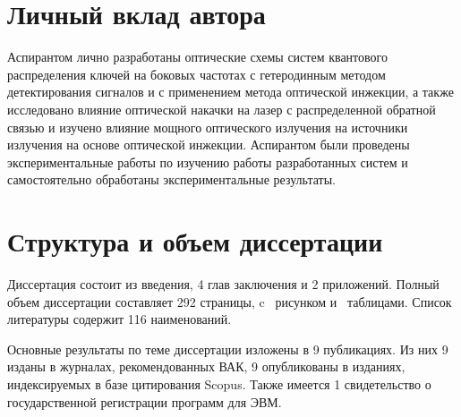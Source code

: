 \section*{Личный вклад автора}
Аспирантом лично разработаны оптические схемы систем квантового распределения ключей на боковых частотах с гетеродинным методом детектирования сигналов и с применением метода оптической инжекции, а также исследовано влияние оптической накачки на лазер с распределенной обратной связью и изучено влияние мощного оптического излучения на источники излучения на основе оптической инжекции. Аспирантом были проведены экспериментальные работы по изучению работы разработанных систем и самостоятельно обработаны экспериментальные результаты.
\section*{Структура и объем диссертации} Диссертация состоит из введения, 4 глав заключения и 2 приложений. Полный объем диссертации составляет 292 страницы, c  \totalfigures\ рисунком  и \totaltables\ таблицами. Список литературы содержит 116 наименований.

Основные результаты по теме диссертации изложены в 9 публикациях. Из них 9 изданы в журналах, рекомендованных ВАК, 9 опубликованы в изданиях, индексируемых в базе цитирования Scopus. Также имеется 1 свидетельство о государственной регистрации программ для ЭВМ.\\

